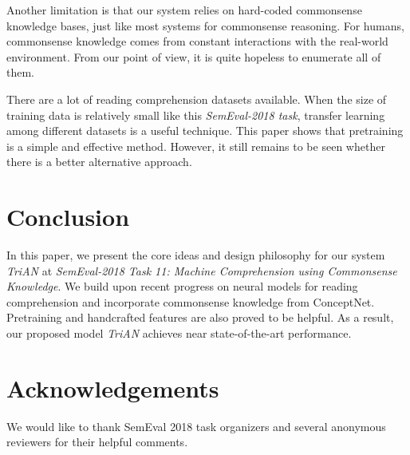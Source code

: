 \documentclass[11pt,a4paper]{article}
\begin{document}
Another limitation is that
our system relies on hard-coded commonsense knowledge bases,
just like most systems for commonsense reasoning.
For humans,
commonsense knowledge comes from constant interactions with the real-world environment.
From our point of view,
it is quite hopeless to enumerate all of them.

There are a lot of reading comprehension datasets available.
When the size of training data is relatively small like this \emph{SemEval-2018 task},
transfer learning among different datasets is a useful technique.
This paper shows that pretraining is a simple and effective method.
However,
it still remains to be seen whether there is a better alternative approach.

\section{Conclusion}
In this paper,
we present the core ideas and design philosophy
for our system \emph{TriAN} at \emph{SemEval-2018 Task 11: Machine Comprehension using Commonsense Knowledge}.
We build upon recent progress on neural models for reading comprehension
and incorporate commonsense knowledge from ConceptNet.
Pretraining and handcrafted features are also proved to be helpful.
As a result,
our proposed model \emph{TriAN} achieves near state-of-the-art performance.

\section*{Acknowledgements}
We would like to thank SemEval 2018 task organizers
and several anonymous reviewers for their helpful comments.



\end{document}

